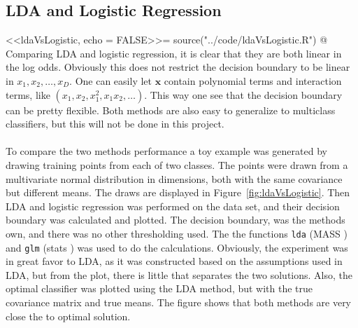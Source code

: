 \subsection{LDA and Logistic Regression}
\label{sub:LDA and Logistic Regre}
<<ldaVsLogistic, echo = FALSE>>=
source("../code/ldaVsLogistic.R")
@
Comparing LDA and logistic regression, it is clear that they are both linear in the log odds. Obviously this does not restrict the decision boundary to be linear in $x_1, x_2, \ldots , x_D$. One can easily let $\mathbf{x}$ contain polynomial terms and interaction terms, like $(x_1, x_2, x_1^2, x_1 x_2, \ldots )$. This way one see that the decision boundary can be pretty flexible. Both methods are also easy to generalize to multiclass classifiers, but this will not be done in this project. \\
\\
To compare the two methods performance a toy example was generated by drawing  training points from each of two classes. The points were drawn from a multivariate normal distribution in  dimensions, both with the same covariance but different means. The draws are displayed in Figure~\ref{fig:ldaVsLogistic}. Then LDA and logistic regression was performed on the data set, and their decision boundary was calculated and plotted. The decision boundary, was the methods own, and there was no other thresholding used. The the functions \verb+lda+ (MASS \cite{mass}) and \verb+glm+ (stats \cite{stats}) was used to do the calculations. Obviously, the experiment was in great favor to LDA, as it was constructed based on the assumptions used in LDA, but from the plot, there is little that separates the two solutions. Also, the optimal classifier was plotted using the LDA method, but with the true covariance matrix and true means. The figure shows that both methods are very close the to optimal solution.

